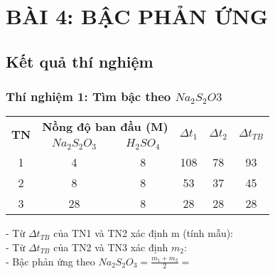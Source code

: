 \chapter{BÀI 4: BẬC PHẢN ỨNG}
    \section{Kết quả thí nghiệm}
    \subsection{Thí nghiệm 1: Tìm bậc theo $Na_{2}S_{2}O{3}$}
        \begin{center}


    \begin{tabular}{|c|c|c|c|c|c|} 
    \hline
    \multirow{2}{*}{\textbf{TN}} & \multicolumn{2}{c|}{\textbf{Nồng độ ban đầu (M)}} & \multirow{2}{*}{$\Delta t_{1}$} & \multirow{2}{*}{$\Delta t_{2}$} & \multirow{2}{*}{$\Delta t_{TB}$}  \\ 
    \cline{2-3}
                                 & $Na_{2}S_{2}O_{3}$ & $H_{2}SO_{4}$                &                    &                    &                     \\ 
    \hline
                 1               &       4            &              8               &          108       &         78         &          93         \\ 
    \hline
                 2               &       8            &              8               &           53       &         37         &          45         \\ 
    \hline
                 3               &       28           &              8               &           28       &         28         &          28         \\
    \hline
    \end{tabular}


        \end{center}

- Từ $\Delta t_{TB}$ của TN1 và TN2 xác định m (tính mẫu):\\

- Từ $\Delta t_{TB}$ của TN2 và TN3 xác định $m_{2}$:\\

- Bậc phản ứng theo $Na_{2}S_{2}O_{3} = \frac{m_{1} + m_{2}}{2} = $\\

